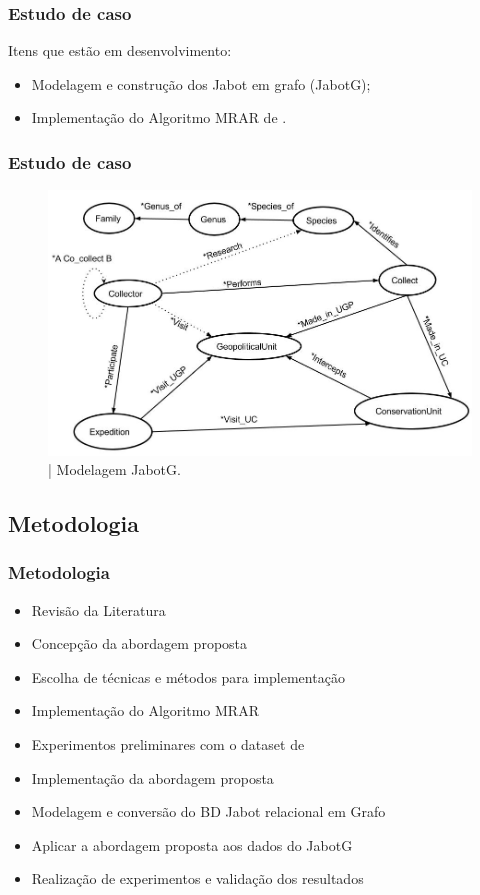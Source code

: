 \documentclass[hyperref={pdfpagelabels=false}]{beamer}
\begin{document}
\begin{frame}
   \frametitle{Estudo de caso}
	
    Itens que estão em desenvolvimento:
    \begin{itemize}
    	\item Modelagem e construção dos Jabot em grafo (JabotG);
            \item Implementação do Algoritmo MRAR de \cite{Ramezani2014}.
	\end{itemize}
\end{frame}
    
    
    
	\begin{frame}
    \frametitle{Estudo de caso}
    \begin{figure}[h]
	\centering
		\includegraphics[scale=0.3]{img/SchemeJabot_-_Grafo}
	\caption{| Modelagem JabotG.}
	\label{fig:SchemeJabot_-_Grafo}
\end{figure}
	\end{frame}    
    
    
  \subsection{Metodologia}  
	\begin{frame}
    \frametitle{Metodologia}
     \begin{itemize}
        	\item Revisão da Literatura
            \item Concepção da abordagem proposta
            \item Escolha de técnicas e métodos para implementação
            \item Implementação do Algoritmo MRAR
            \item Experimentos preliminares com o dataset de  \cite{Ramezani2014}
            \item Implementação da abordagem proposta
           	\item Modelagem e conversão do BD Jabot relacional em Grafo 
			\item Aplicar a abordagem proposta aos dados do JabotG
			\item Realização de experimentos e validação dos resultados
		\end{itemize}
	\end{frame}
    
\end{document}

